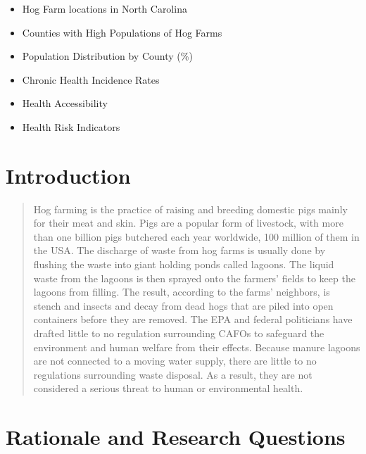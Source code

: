 \documentclass[
  12pt,
]{article}
\providecommand{\tightlist}{%
  \setlength{\itemsep}{0pt}\setlength{\parskip}{0pt}}
\begin{document}
\begin{itemize}
\tightlist
\item
  Hog Farm locations in North Carolina
\item
  Counties with High Populations of Hog Farms
\item
  Population Distribution by County (\%)
\item
  Chronic Health Incidence Rates
\item
  Health Accessibility
\item
  Health Risk Indicators
\end{itemize}

\newpage

\hypertarget{introduction}{%
\section{Introduction}\label{introduction}}

\begin{quote}
Hog farming is the practice of raising and breeding domestic pigs mainly
for their meat and skin. Pigs are a popular form of livestock, with more
than one billion pigs butchered each year worldwide, 100 million of them
in the USA. The discharge of waste from hog farms is usually done by
flushing the waste into giant holding ponds called lagoons. The liquid
waste from the lagoons is then sprayed onto the farmers' fields to keep
the lagoons from filling. The result, according to the farms' neighbors,
is stench and insects and decay from dead hogs that are piled into open
containers before they are removed. The EPA and federal politicians have
drafted little to no regulation surrounding CAFOs to safeguard the
environment and human welfare from their effects. Because manure lagoons
are not connected to a moving water supply, there are little to no
regulations surrounding waste disposal. As a result, they are not
considered a serious threat to human or environmental health.
\end{quote}

\hypertarget{rationale-and-research-questions}{%
\section{Rationale and Research
Questions}\label{rationale-and-research-questions}}
\end{document}
